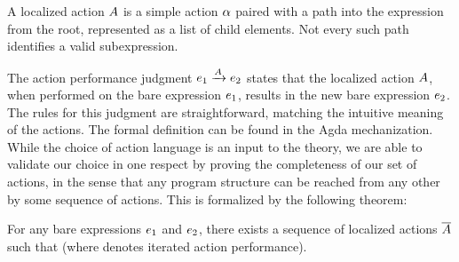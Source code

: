 A localized action $A$ is a simple action $\alpha$ paired with a path into the expression from the root, represented as a list of child elements. Not every such path identifies a valid subexpression.

The action performance judgment $e_1\xrightarrow{A}e_2$ states that the localized action $A$, when performed on the bare expression $e_1$, results in the new bare expression $e_2$. The rules for this judgment are straightforward, matching the intuitive meaning of the actions. The formal definition can be found in the Agda mechanization. While the choice of action language is an input to the theory, we are able to validate our choice in one respect by proving the completeness of our set of actions, in the sense that any program structure can be reached from any other by some sequence of actions. This is formalized by the following theorem:

\begin{theorem}
    For any bare expressions $e_1$ and $e_2$, there exists a sequence of localized actions $\overline{A}$ such that  (where  denotes iterated action performance). 
\end{theorem}
